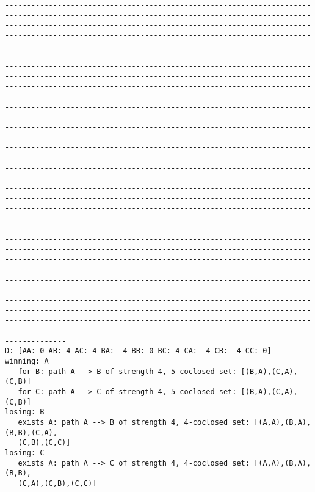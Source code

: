 \documentclass{llncs}
\begin{document}
\begin{verbatim}
--------------------------------------------------------------------------------------------------------------------------------------------------------------------------------------------------------------------------------------------------------------------------------------------------------------------------------------------------------------------------------------------------------------------------------------------------------------------------------------------------------------------------------------------------------------------------------------------------------------------------------------------------------------------------------------------------------------------------------------------------------------------------------------------------------------------------------------------------------------------------------------------------------------------------------------------------------------------------------------------------------------------------------------------------------------------------------------------------------------------------------------------------------------------------------------------------------------------------------------------------------------------------------------------------------------------------------------------------------------------------------------------------------------------------------------------------------------------------------------------------------------------------------------------------------------------------------------------------------------------------------------------------------------------------------------------------------------------------------------------------------------------------------------------------------------------------------------------------------------------------------------------------------------------------------------------------------------------------------------------------------------------------------------------------------------------------------------------------------------------------------------------------------------------------------------------------------------------------------------------------------------------------------------------------------------------------------------------------------------------------------------------------------------------
D: [AA: 0 AB: 4 AC: 4 BA: -4 BB: 0 BC: 4 CA: -4 CB: -4 CC: 0]
winning: A
   for B: path A --> B of strength 4, 5-coclosed set: [(B,A),(C,A),(C,B)]
   for C: path A --> C of strength 4, 5-coclosed set: [(B,A),(C,A),(C,B)] 
losing: B
   exists A: path A --> B of strength 4, 4-coclosed set: [(A,A),(B,A),(B,B),(C,A),
   (C,B),(C,C)]
losing: C
   exists A: path A --> C of strength 4, 4-coclosed set: [(A,A),(B,A),(B,B),
   (C,A),(C,B),(C,C)]

\end{verbatim}
\end{document}
